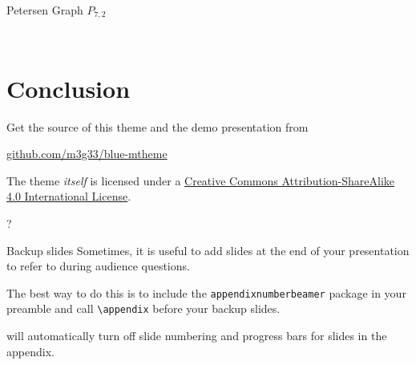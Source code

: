 \documentclass[10pt,aspectratio=169,english]{beamer}
\begin{document}
\begin{frame}{Petersen Graph $P_{7,2}$}
{\begin{columns}[T]
\begin{column}{.40\textwidth}
\begin{figure}[h!]
\end{figure}%
%
\end{column}%
\end{columns}

}

\end{frame}




\section{Conclusion}

\begin{frame}{}

  Get the source of this theme and the demo presentation from

  \begin{center}\url{github.com/m3g33/blue-mtheme}\end{center}

  The theme \emph{itself} is licensed under a
  \href{http://creativecommons.org/licenses/by-sa/4.0/}{Creative Commons
  Attribution-ShareAlike 4.0 International License}.

  \begin{center}\ccbysa\end{center}

\end{frame}

\begin{frame}[standout]
  ?
\end{frame}

\appendix

\begin{frame}[fragile]{Backup slides}
  Sometimes, it is useful to add slides at the end of your presentation to
  refer to during audience questions.

  The best way to do this is to include the \verb|appendixnumberbeamer|
  package in your preamble and call \verb|\appendix| before your backup slides.

  \themename will automatically turn off slide numbering and progress bars for
  slides in the appendix.
\end{frame}

\begin{frame}[allowframebreaks]{}

  
  

\end{frame}
\end{document}
